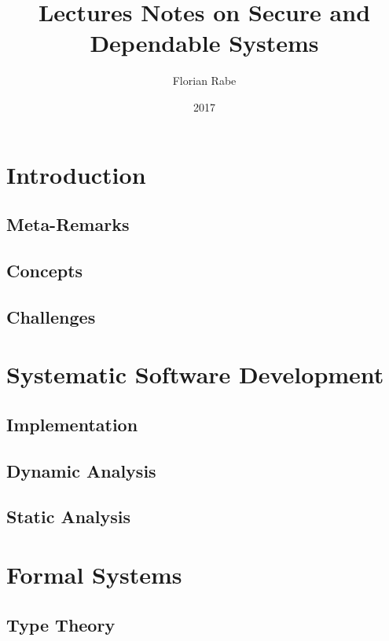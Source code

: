 \documentclass{book}
\title{Lectures Notes on Secure and Dependable Systems}
\author{Florian Rabe}
\date{2017}
\begin{document}
\maketitle

\tableofcontents
\newpage

\part{Introduction}

 \chapter{Meta-Remarks}
  

  \chapter{Concepts}
   

 \chapter{Challenges}
   

\part{Systematic Software Development}

  \chapter{Implementation}\label{sec:sd:systimpl}
    

  \chapter{Dynamic Analysis}\label{sec:sd:dynamic}
    

  \chapter{Static Analysis}\label{sec:sd:static}
    
    
\part{Formal Systems}
   
  \chapter{Type Theory}\label{sec:sd:typetheory}
  
\end{document}
